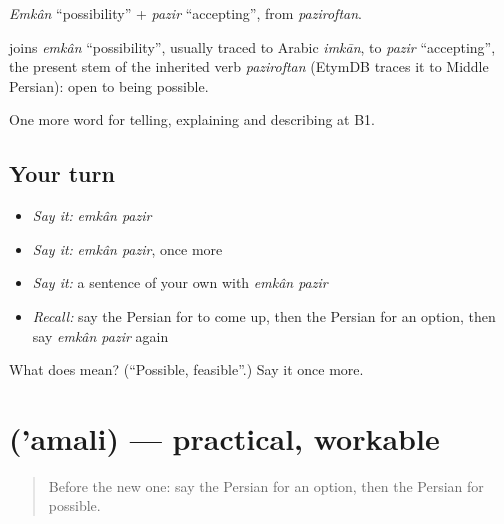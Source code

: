 \emph{Emkân} \textquotedblleft{}possibility\textquotedblright{} + \emph{pazir} \textquotedblleft{}accepting\textquotedblright{}, from \emph{paziroftan}.

\begin{cousinweb}
\textbf{ } joins \emph{emkân} \textquotedblleft{}possibility\textquotedblright{}, usually traced to Arabic \emph{imkān}, to \emph{pazir} \textquotedblleft{}accepting\textquotedblright{}, the present stem of the inherited verb \emph{paziroftan} (EtymDB traces it to Middle Persian): open to being possible.
\end{cousinweb}

\begin{grammarlens}[title={What you've built}]
One more word for telling, explaining and describing at B1.
\end{grammarlens}

\subsection*{Your turn}
\begin{itemize}
\raggedright
  \item \emph{Say it:} \emph{emkân pazir}
  \item \emph{Say it:} \emph{emkân pazir}, once more
  \item \emph{Say it:} a sentence of your own with \emph{emkân pazir}
  \item \emph{Recall:} say the Persian for to come up, then the Persian for an option, then say \emph{emkân pazir} again
\end{itemize}

\begin{tcolorbox}[breakable,colback=teal!4,colframe=teal!35!black,title={Before you move on}]
What does   mean? (\textquotedblleft{}Possible, feasible\textquotedblright{}.) Say it once more.
\end{tcolorbox}
\section[\texorpdfstring{\fa{عملی} ('amali)}{عملی ('amali)}]{ ('amali) — practical, workable}

\label{lesson:FA-C398-amali}



\begin{quote}
Before the new one: say the Persian for an option, then the Persian for possible.
\end{quote}

